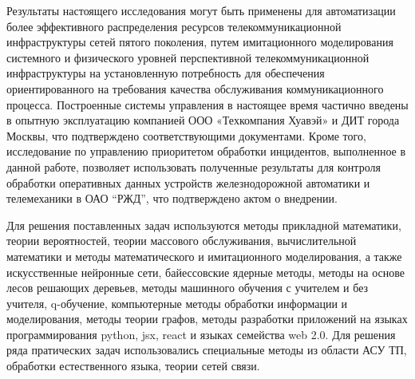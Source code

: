{\influence} Результаты настоящего исследования могут быть применены для автоматизации более эффективного распределения ресурсов телекоммуникационной инфраструктуры сетей пятого поколения, путем  имитационного моделирования системного и физического уровней перспективной телекоммуникационной инфраструктуры на установленную потребность для обеспечения ориентированного на требования качества обслуживания коммуникационного процесса. Построенные системы управления в настоящее время частично введены в опытную эксплуатацию компанией ООО «Техкомпания Хуавэй» и ДИТ города Москвы,  что подтверждено соответствующими документами. Кроме того, исследование по управлению приоритетом обработки инцидентов, выполненное в данной работе, позволяет использовать полученные результаты для контроля обработки оперативных данных устройств железнодорожной автоматики и телемеханики в ОАО “РЖД”, что подтверждено актом о внедрении.


{\methods} Для решения поставленных задач используются методы прикладной математики, теории вероятностей, теории массового обслуживания, вычислительной математики и методы математического и имитационного моделирования, а также искусственные нейронные сети, байессовские ядерные методы, методы на основе лесов решающих деревьев, методы машинного обучения  с учителем и без учителя, q-обучение, компьютерные методы обработки информации и моделирования, методы теории графов, методы разработки приложений на языках программирования python, jsx, react и языках семейства web 2.0. Для решения ряда пратических задач использовались  специальные методы из области АСУ ТП, обработки естественного языка, теории сетей связи.


